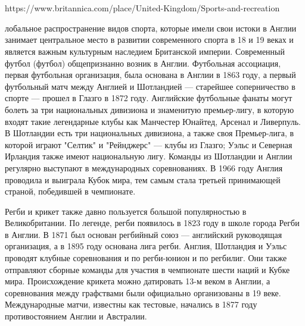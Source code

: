 \section{}
\subsection{}

https://www.britannica.com/place/United-Kingdom/Sports-and-recreation

лобальное распространение видов спорта, которые имели свои истоки в Англии занимает центральное место в развитии современного спорта в 18 и 19 веках и является важным культурным наследием Британской империи. Современный футбол (футбол) общепризнанно возник в Англии. Футбольная ассоциация, первая футбольная организация, была основана в Англии в 1863 году, а первый футбольный матч между Англией и Шотландией — старейшее соперничество в спорте — прошел в Глазго в 1872 году. Английские футбольные фанаты могут болеть за три национальных дивизиона и знаменитую премьер-лигу, в которую входят такие легендарные клубы как Манчестер Юнайтед, Арсенал и Ливерпуль. В Шотландии есть три национальных дивизиона, а также своя Премьер-лига, в которой играют "Селтик" и "Рейнджерс" --- клубы из Глазго; Уэльс и Северная Ирландия также имеют национальную лигу. Команды из Шотландии и Англии регулярно выступают в международных соревнованиях. В 1966 году Англия проводила и выиграла Кубок мира, тем самым стала третьей принимающей страной, победившей в чемпионате.

Регби и крикет также давно пользуется большой популярностью в Великобритании. По легенде, регби появилось в 1823 году в школе города Регби в Англии. В 1871 был основан регбийный союз --- английский руководящая организация, а в 1895 году основана лига регби. Англия, Шотландия и Уэльс проводят клубные соревнования  и по регби-юнион и по регбилиг. Они также отправляют сборные команды для участия в чемпионате шести наций и Кубке мира. Происхождение крикета можно датировать 13-м веком в Англии, а соревнования между графствами были официально организованы в 19 веке. Международные матчи, известны как тестовые, начались в 1877 году противостоянием Англии и Австралии.

